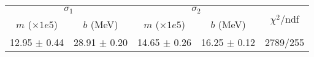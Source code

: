 \begin{tabular}{cc|cc||c}
\multicolumn{2}{c|}{$\sigma_1$} & \multicolumn{2}{|c}{$\sigma_2$}  & \multirow{2}{*}{$\chi^2/$ndf}\\
$m$ ($\times1e5$) & $b$ (MeV) & $m$ ($\times1e5$) & $b$ (MeV)  & \\
\hline
12.95 $\pm$ 0.44 & 28.91 $\pm$ 0.20 & 14.65 $\pm$ 0.26 & 16.25 $\pm$ 0.12 & 2789/255\\
\end{tabular}
